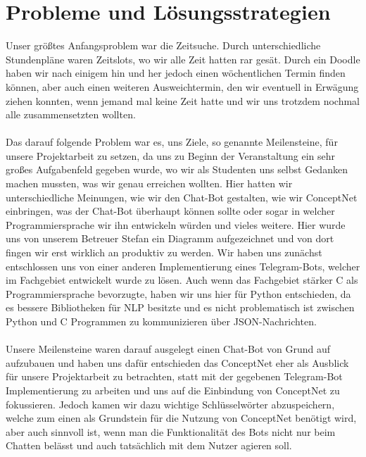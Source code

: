 \documentclass[12pt]{article}
\begin{document}
\clearpage

\section{Probleme und Lösungsstrategien}
Unser größtes Anfangsproblem war die Zeitsuche. Durch unterschiedliche Stundenpläne waren Zeitslots, wo wir alle Zeit hatten rar gesät. Durch ein Doodle haben wir nach einigem hin und her jedoch einen wöchentlichen Termin finden können, aber auch einen weiteren Ausweichtermin, den wir eventuell in Erwägung ziehen konnten, wenn jemand mal keine Zeit hatte und wir uns trotzdem nochmal alle zusammensetzten wollten.
\\ \\
Das darauf folgende Problem war es, uns Ziele, so genannte Meilensteine, für unsere Projektarbeit zu setzen, da uns zu Beginn der Veranstaltung ein sehr großes Aufgabenfeld gegeben wurde, wo wir als Studenten uns selbst Gedanken machen mussten, was wir genau erreichen wollten. Hier hatten wir unterschiedliche Meinungen, wie wir den Chat-Bot gestalten, wie wir ConceptNet einbringen, was der Chat-Bot überhaupt können sollte oder sogar in welcher Programmiersprache wir ihn entwickeln würden und vieles weitere.
Hier wurde uns von unserem Betreuer Stefan ein Diagramm aufgezeichnet und von dort fingen wir erst wirklich an produktiv zu werden. Wir haben uns zunächst entschlossen uns von einer anderen Implementierung eines Telegram-Bots, welcher im Fachgebiet entwickelt wurde zu lösen. Auch wenn das Fachgebiet stärker C als Programmiersprache bevorzugte, haben wir uns hier für Python entschieden, da es bessere Bibliotheken für NLP besitzte und es nicht problematisch ist zwischen Python und C Programmen zu kommunizieren über JSON-Nachrichten.
\\ \\
Unsere Meilensteine waren darauf ausgelegt einen Chat-Bot von Grund auf aufzubauen und haben uns dafür entschieden das ConceptNet eher als Ausblick für unsere Projektarbeit zu betrachten, statt mit der gegebenen Telegram-Bot Implementierung zu arbeiten und uns auf die Einbindung von ConceptNet zu fokussieren. Jedoch kamen wir dazu wichtige Schlüsselwörter abzuspeichern, welche zum einen als Grundstein für die Nutzung von ConceptNet benötigt wird, aber auch sinnvoll ist, wenn man die Funktionalität des Bots nicht nur beim Chatten belässt und auch tatsächlich mit dem Nutzer agieren soll.
\clearpage
\end{document}
